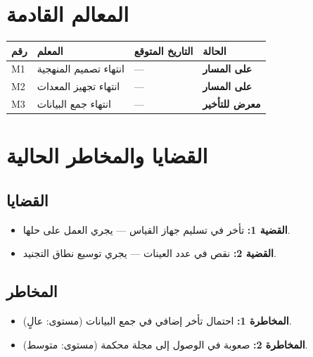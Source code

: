 \documentclass[11pt,a4paper]{article}
\begin{document}
\section{المعالم القادمة}
\label{sec:upcoming}

\begin{table}[H]
\centering
\renewcommand{\arraystretch}{1.4}
\begin{tabularx}{\textwidth}{C{1cm} L{5cm} C{3cm} C{3cm}}
\toprule
\textbf{رقم} & \textbf{المعلم} & \textbf{التاريخ المتوقع} & \textbf{الحالة} \\
\midrule
M1 & انتهاء تصميم المنهجية & --- & \color{statusYellow}\textbf{على المسار} \\
M2 & انتهاء تجهيز المعدات & --- & \color{statusYellow}\textbf{على المسار} \\
M3 & انتهاء جمع البيانات & --- & \color{statusRed}\textbf{معرض للتأخير} \\
\bottomrule
\end{tabularx}
\end{table}

\section{القضايا والمخاطر الحالية}
\label{sec:issues}

\subsection{القضايا}
\begin{itemize}
    \item \textbf{القضية 1:} تأخر في تسليم جهاز القياس — يجري العمل على حلها.
    \item \textbf{القضية 2:} نقص في عدد العينات — يجري توسيع نطاق التجنيد.
\end{itemize}

\subsection{المخاطر}
\begin{itemize}
    \item \textbf{المخاطرة 1:} احتمال تأخر إضافي في جمع البيانات (مستوى: عالٍ).
    \item \textbf{المخاطرة 2:} صعوبة في الوصول إلى مجلة محكمة (مستوى: متوسط).
\end{itemize}
\end{document}
